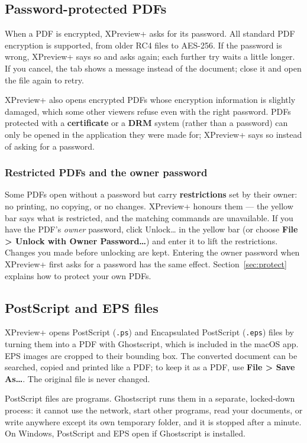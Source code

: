 \documentclass[11pt,a4paper]{article}
\newcommand{\app}{XPreview+}
\newcommand{\menu}[1]{\textsf{\textbf{#1}}}
\newcommand{\ui}[1]{\textsf{#1}}
\newcommand{\file}[1]{\texttt{#1}}
\begin{document}
\subsection{Password-protected PDFs}
When a PDF is encrypted, \app{} asks for its password. All standard PDF encryption is
supported, from older RC4 files to AES-256. If the password is wrong, \app{} says so and asks
again; each further try waits a little longer. If you cancel, the tab shows a message instead
of the document; close it and open the file again to retry.

\app{} also opens encrypted PDFs whose encryption information is slightly damaged, which
some other viewers refuse even with the right password. PDFs protected with a
\textbf{certificate} or a \textbf{DRM} system (rather than a password) can only be opened in
the application they were made for; \app{} says so instead of asking for a password.

\subsubsection*{Restricted PDFs and the owner password}\label{sec:unlock}
Some PDFs open without a password but carry \textbf{restrictions} set by their owner: no
printing, no copying, or no changes. \app{} honours them --- the yellow bar says what is
restricted, and the matching commands are unavailable. If you have the PDF's \emph{owner}
password, click \ui{Unlock\ldots} in the yellow bar (or choose
\menu{File > Unlock with Owner Password\ldots}) and enter it to lift the restrictions. Changes
you made before unlocking are kept. Entering the owner password when \app{} first asks for a
password has the same effect. Section~\ref{sec:protect} explains how to protect your own PDFs.

\subsection{PostScript and EPS files}
\app{} opens PostScript (\file{.ps}) and Encapsulated PostScript (\file{.eps}) files by turning
them into a PDF with Ghostscript, which is included in the macOS app. EPS images are cropped to
their bounding box. The converted document can be searched, copied and printed like a PDF;
to keep it as a PDF, use \menu{File > Save As\ldots}. The original file is never changed.

\begin{note}
PostScript files are programs. Ghostscript runs them in a separate, locked-down process: it
cannot use the network, start other programs, read your documents, or write anywhere except
its own temporary folder, and it is stopped after a minute. On Windows, PostScript and EPS
open if Ghostscript is installed.
\end{note}
\end{document}
